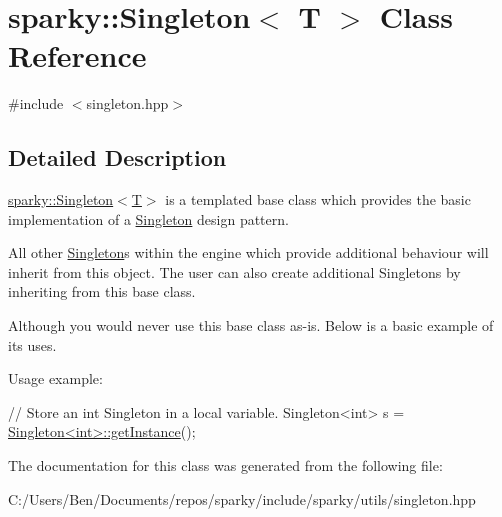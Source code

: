 \hypertarget{classsparky_1_1_singleton_3_01_t_01_4}{}\section{sparky\+:\+:Singleton$<$ T $>$ Class Reference}
\label{classsparky_1_1_singleton_3_01_t_01_4}


{\ttfamily \#include $<$singleton.\+hpp$>$}



\subsection{Detailed Description}
\hyperlink{classsparky_1_1_singleton_3_01_t_01_4}{sparky\+::\+Singleton$<$\+T$>$} is a templated base class which provides the basic implementation of a \hyperlink{classsparky_1_1_singleton}{Singleton} design pattern.

All other \hyperlink{classsparky_1_1_singleton}{Singleton}\textquotesingle{}s within the engine which provide additional behaviour will inherit from this object. The user can also create additional Singletons by inheriting from this base class.

Although you would never use this base class as-\/is. Below is a basic example of it\textquotesingle{}s uses.

Usage example\+: 
\begin{DoxyCode}
\textcolor{comment}{// Store an int Singleton in a local variable.}
Singleton<int> s = \hyperlink{classsparky_1_1_singleton_a8e56848cf24e5f4cdcd493c64d576f10}{Singleton<int>::getInstance}();
\end{DoxyCode}
 

The documentation for this class was generated from the following file\+:\begin{DoxyCompactItemize}
\item 
C\+:/\+Users/\+Ben/\+Documents/repos/sparky/include/sparky/utils/singleton.\+hpp\end{DoxyCompactItemize}
